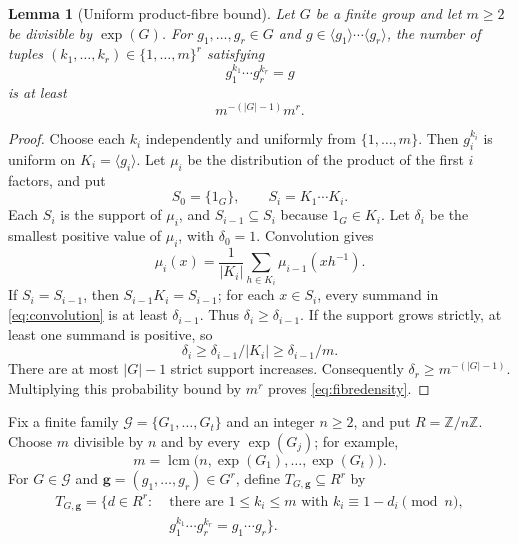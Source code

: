 \documentclass[10pt,a4paper]{amsart}
\newtheorem{lemma}[theorem]{Lemma}
\numberwithin{equation}{section}
\newcommand{\expon}{\operatorname{exp}}
\newcommand{\Z}{\mathbb{Z}}
\newcommand{\calG}{\mathcal{G}}
\renewcommand{\leq}{\leqslant}
\renewcommand{\geq}{\geqslant}
\begin{document}
\begin{lemma}[Uniform product-fibre bound]\label{lem:fibres}
Let $G$ be a finite group and let $m\geq 2$ be divisible by $\expon(G)$. For $g_1,\ldots,g_r\in G$ and $g\in\langle g_1\rangle\cdots\langle g_r\rangle$, the number of tuples $(k_1,\ldots,k_r)\in\{1,\ldots,m\}^r$ satisfying
\[
 g_1^{k_1}\cdots g_r^{k_r}=g
\]
is at least
\begin{equation}\label{eq:fibredensity}
 m^{-(|G|-1)}m^r.
\end{equation}
\end{lemma}
\begin{proof}
Choose each $k_i$ independently and uniformly from $\{1,\ldots,m\}$. Then $g_i^{k_i}$ is uniform on $K_i=\langle g_i\rangle$. Let $\mu_i$ be the distribution of the product of the first $i$ factors, and put
\[
 S_0=\{1_G\},\qquad S_i=K_1\cdots K_i.
\]
Each $S_i$ is the support of $\mu_i$, and $S_{i-1}\subseteq S_i$ because $1_G\in K_i$. Let $\delta_i$ be the smallest positive value of $\mu_i$, with $\delta_0=1$. Convolution gives
\begin{equation}\label{eq:convolution}
 \mu_i(x)=\frac{1}{|K_i|}\sum_{h\in K_i}\mu_{i-1}(xh^{-1}).
\end{equation}
If $S_i=S_{i-1}$, then $S_{i-1}K_i=S_{i-1}$; for each $x\in S_i$, every summand in \eqref{eq:convolution} is at least $\delta_{i-1}$. Thus $\delta_i\geq\delta_{i-1}$. If the support grows strictly, at least one summand is positive, so
\[
 \delta_i\geq\delta_{i-1}/|K_i|\geq\delta_{i-1}/m.
\]
There are at most $|G|-1$ strict support increases. Consequently $\delta_r\geq m^{-(|G|-1)}$. Multiplying this probability bound by $m^r$ proves \eqref{eq:fibredensity}.
\end{proof}

Fix a finite family $\calG=\{G_1,\ldots,G_t\}$ and an integer $n\geq 2$, and put $R=\Z/n\Z$. Choose $m$ divisible by $n$ and by every $\expon(G_j)$; for example,
\begin{equation}\label{eq:commonexponent}
 m=\operatorname{lcm}\bigl(n,\expon(G_1),\ldots,\expon(G_t)\bigr).
\end{equation}
For $G\in\calG$ and $\boldsymbol{g}=(g_1,\ldots,g_r)\in G^r$, define $T_{G,\boldsymbol{g}}\subseteq R^r$ by
\begin{equation}\label{eq:targetset}
 \begin{split}
 T_{G,\boldsymbol{g}}=\bigl\{d\in R^r:\;&\text{there are }1\leq k_i\leq m\text{ with }
 k_i\equiv 1-d_i\pmod n,\\[-1mm]
 &g_1^{k_1}\cdots g_r^{k_r}=g_1\cdots g_r\bigr\}.
 \end{split}
\end{equation}
\end{document}
